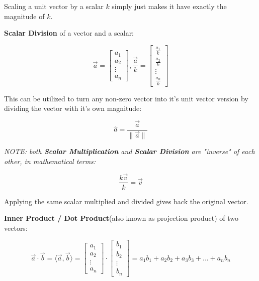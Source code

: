 Scaling a unit vector by a scalar $k$ simply just makes it have exactly the magnitude of $k$.


\sgap

\textbf{Scalar Division} of a vector and a scalar:
\begin{center}
    \[
        \vec{a}=\begin{bmatrix}a_1 \\ a_2 \\ \vdots \\ a_n\end{bmatrix},\frac{\vec{a}}{k}=\begin{bmatrix}\frac{a_1}{k} \\ \frac{a_2}{k} \\ \vdots \\ \frac{a_n}{k}\end{bmatrix}
    \]
\end{center}

This can be utilized to turn any non-zero vector into it's unit vector version by dividing the vector with it's own magnitude:
\begin{center}
    \[
        {\hat{a}}=\frac{\vec{a}}{\|\vec{a}\|}
    \]
\end{center}

\vspace{.5em}

\emph{
    NOTE: both \textbf{Scalar Multiplication} and \textbf{Scalar Division} are "inverse" of each other, in mathematical terms:
}
\begin{center}
    \[
        \frac{k\vec{v}}{k}=\vec{v}
    \]
\end{center}

Applying the same scalar multiplied and divided gives back the original vector.



\sgap

\textbf{Inner Product / Dot Product}(also known as projection product) of two vectors:
\begin{center}
    \[
        {\vec{a}} \cdot {\vec{b}}=\langle \vec{a}, \vec{b} \rangle=\begin{bmatrix}a_1 \\ a_2 \\ \vdots \\ a_n\end{bmatrix} \cdot \begin{bmatrix}b_1 \\ b_2 \\ \vdots \\ b_n\end{bmatrix}=a_1b_1+a_2b_2+a_3b_3+...+a_nb_n
    \]
\end{center}

